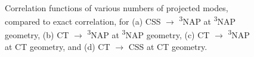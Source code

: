 \begin{figure}[]
\\
\caption{
Correlation functions of various numbers of projected modes, compared to exact correlation, for (a) CSS $\rightarrow$ \textsuperscript{3}NAP at \textsuperscript{3}NAP geometry, (b) CT $\rightarrow$ \textsuperscript{3}NAP at \textsuperscript{3}NAP geometry, (c) CT $\rightarrow$ \textsuperscript{3}NAP at CT geometry, and (d) CT $\rightarrow$ CSS at CT geometry.
}\label{corrT1T3}
\end{figure}



